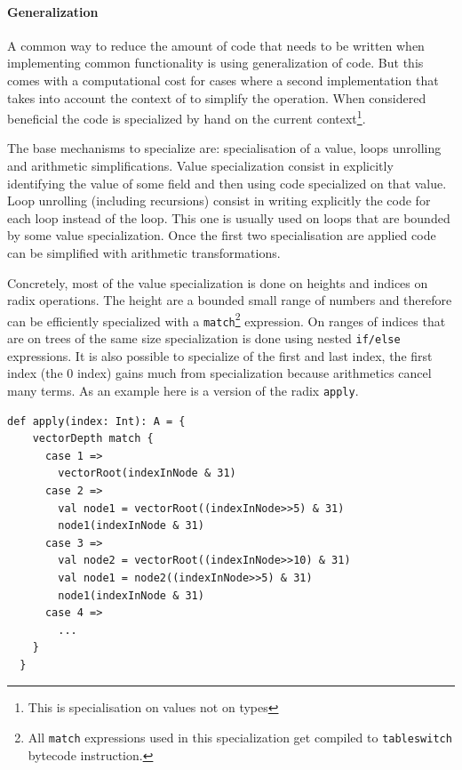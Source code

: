 \paragraph{Generalization}
A common way to reduce the amount of code that needs to be written when implementing common functionality is using generalization of code. But this comes with a computational cost for cases where a second implementation that takes into account the context of to simplify the operation. When considered beneficial the code is specialized by hand on the current context\footnote{This is specialisation on values not on types}. 

The base mechanisms to specialize are: specialisation of a value, loops unrolling and arithmetic simplifications. Value specialization consist in explicitly identifying the value of some field and then using code specialized on that value. Loop unrolling (including recursions) consist in writing explicitly the code for each loop instead of the loop. This one is usually used on loops that are bounded by some value specialization. Once the first two specialisation are applied code can be simplified with arithmetic transformations. 

Concretely, most of the value specialization is done on heights and indices on radix operations. The height are a bounded small range of numbers and therefore can be efficiently specialized with a \texttt{match}\footnote{All \texttt{match} expressions used in this specialization get compiled to \texttt{tableswitch} bytecode instruction.} expression. On ranges of indices that are on trees of the same size specialization is done using nested \texttt{if/else} expressions. It is also possible to specialize of the first and last index, the first index (the 0 index) gains much from specialization because arithmetics cancel many terms. As an example here is a version of the radix \texttt{apply}.

\begin{lstlisting}[frame=single]
def apply(index: Int): A = {
    vectorDepth match {
      case 1 => 
        vectorRoot(indexInNode & 31)
      case 2 => 
        val node1 = vectorRoot((indexInNode>>5) & 31)
        node1(indexInNode & 31)
      case 3 => 
        val node2 = vectorRoot((indexInNode>>10) & 31)
        val node1 = node2((indexInNode>>5) & 31)
        node1(indexInNode & 31)
      case 4 =>
        ...
    }
  }
\end{lstlisting}

